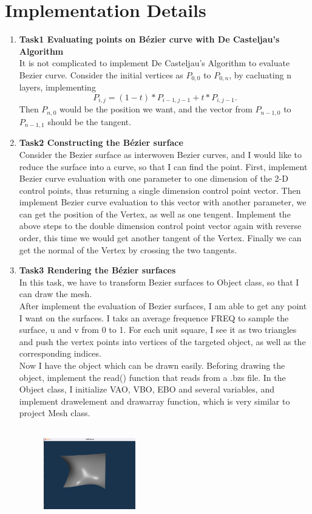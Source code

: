 \documentclass[acmtog]{acmart}
\begin{document}
\section{Implementation Details}
\begin{enumerate}
	\item \textbf{Task1 Evaluating points on Bézier curve with De Casteljau's Algorithm}\\
	It is not complicated to implement De Casteljau's Algorithm to evaluate Bezier curve. Consider the initial vertices as $P_{0,0}$ to $P_{0,n}$, by cacluating n layers, implementing 
	$$P_{i,j} = (1-t)*P_{i-1,j-1} + t*P_{i,j-1}.$$ Then $P_{n,0}$ would be the position we want, and the vector from $P_{n-1,0}$ to $P_{n-1,1}$ should be the tangent.
	\item \textbf{Task2 Constructing the Bézier surface}\\
	Consider the Bezier surface as interwoven Bezier curves, and I would like to reduce the surface into a curve, so that I can find the point.
	First, implement Bezier curve evaluation with one parameter to one dimension of the 2-D control points, thus returning a single dimension control point vector. Then 
	implement Bezier curve evaluation to this vector with another parameter, we can get the position of the Vertex, as well as one tengent.
	Implement the above steps to the double dimension control point vector again with reverse order, this time we would get another tangent of the Vertex.
	Finally we can get the normal of the Vertex by crossing the two tangents. 
	\item \textbf{Task3 Rendering the Bézier surfaces}\\
	In this task, we have to transform Bezier surfaces to Object class, so that I can draw the mesh.\\
	After implement the evaluation of Bezier surfaces, I am able to get any point I want on the surfaces. I taks an average frequence FREQ to sample the surface, u and v from 0 to 1. For each unit square, I see it as two triangles and push the vertex points into vertices of the targeted object, as well as the corresponding indices.\\
	Now I have the object which can be drawn easily. Beforing drawing the object, implement the read() function that reads from a .bzs file. In the Object class, I initialize VAO, VBO, EBO and several variables, and implement
	drawelement and drawarray function, which is very similar to project Mesh class.
	\begin{figure}[h]
		\includegraphics[width=4cm,height=4cm]{bezier.png}

\end{figure}
\end{enumerate}
\end{document}
